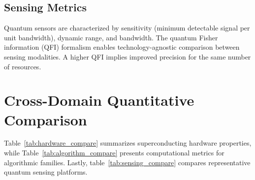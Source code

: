 \subsection*{Sensing Metrics}
Quantum sensors are characterized by sensitivity (minimum detectable signal per unit bandwidth), dynamic range, and bandwidth. The quantum Fisher information (QFI) formalism enables technology-agnostic comparison between sensing modalities. A higher QFI implies improved precision for the same number of resources.



\section{Cross-Domain Quantitative Comparison}
Table~\ref{tab:hardware_compare} summarizes superconducting hardware properties, while Table~\ref{tab:algorithm_compare} presents computational metrics for algorithmic families. Lastly, table~\ref{tab:sensing_compare} compares representative quantum sensing platforms.

\begin{table}[h]
\centering
\caption{Superconducting qubit performance metrics~\cite{kim2021, place2021, kjaergaard2020, krantz2019}.}
\label{tab:hardware_compare}
\end{table}

